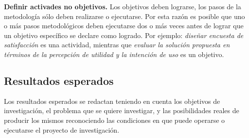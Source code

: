 \textbf{Definir activades no objetivos.} Los objetivos deben lograrse, los pasos de la metodología sólo deben realizarse o ejecutarse. Por esta razón es posible que uno o más pasos metodológicos deben ejecutarse dos o más veces antes de lograr que un objetivo específico se declare como logrado. Por ejemplo: \textit{diseñar encuesta de satisfacción} es una actividad,  mientras que \textit{evaluar la solución propuesta en términos de la percepción de utilidad y la intención de uso} es un objetivo. 




\subsection{Resultados esperados}
Los resultados esperados se redactan teniendo en cuenta los objetivos de investigación, el problema que se quiere investigar, y las posibilidades reales de producir los mismos reconociendo las condiciones en que puede operarse o ejecutarse el proyecto de investigación.